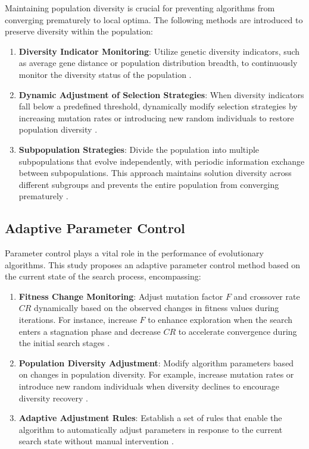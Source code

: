 \documentclass[conference]{IEEEtran}
\begin{document}
Maintaining population diversity is crucial for preventing algorithms from converging prematurely to local optima. The following methods are introduced to preserve diversity within the population:

\begin{enumerate}
    \item \textbf{Diversity Indicator Monitoring}: Utilize genetic diversity indicators, such as average gene distance or population distribution breadth, to continuously monitor the diversity status of the population \cite{burke2013hyper}.
    \item \textbf{Dynamic Adjustment of Selection Strategies}: When diversity indicators fall below a predefined threshold, dynamically modify selection strategies by increasing mutation rates or introducing new random individuals to restore population diversity \cite{grobler2010alternative}.
    \item \textbf{Subpopulation Strategies}: Divide the population into multiple subpopulations that evolve independently, with periodic information exchange between subpopulations. This approach maintains solution diversity across different subgroups and prevents the entire population from converging prematurely \cite{grobler2010alternative}.
\end{enumerate}

\subsection{Adaptive Parameter Control}

Parameter control plays a vital role in the performance of evolutionary algorithms. This study proposes an adaptive parameter control method based on the current state of the search process, encompassing:

\begin{enumerate}
    \item \textbf{Fitness Change Monitoring}: Adjust mutation factor $F$ and crossover rate $CR$ dynamically based on the observed changes in fitness values during iterations. For instance, increase $F$ to enhance exploration when the search enters a stagnation phase and decrease $CR$ to accelerate convergence during the initial search stages \cite{burke2013hyper, grobler2010alternative}.
    \item \textbf{Population Diversity Adjustment}: Modify algorithm parameters based on changes in population diversity. For example, increase mutation rates or introduce new random individuals when diversity declines to encourage diversity recovery \cite{burke2013hyper, grobler2010alternative}.
    \item \textbf{Adaptive Adjustment Rules}: Establish a set of rules that enable the algorithm to automatically adjust parameters in response to the current search state without manual intervention \cite{burke2013hyper, grobler2010alternative}.
\end{enumerate}
\end{document}
